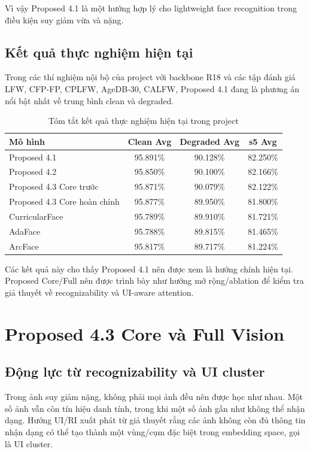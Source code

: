 \documentclass[13pt,a4paper]{extreport}
\begin{document}
Vì vậy Proposed 4.1 là một hướng hợp lý cho lightweight face recognition trong điều kiện suy giảm vừa và nặng.

\section{Kết quả thực nghiệm hiện tại}
Trong các thí nghiệm nội bộ của project với backbone R18 và các tập đánh giá LFW, CFP-FP, CPLFW, AgeDB-30, CALFW, Proposed 4.1 đang là phương án nổi bật nhất về trung bình clean và degraded.

\begin{table}[H]
\centering
\caption{Tóm tắt kết quả thực nghiệm hiện tại trong project}
\begin{tabular}{lccc}
\toprule
\textbf{Mô hình} & \textbf{Clean Avg} & \textbf{Degraded Avg} & \textbf{s5 Avg}\\
\midrule
Proposed 4.1 & 95.891\% & 90.128\% & 82.250\%\\
Proposed 4.2 & 95.850\% & 90.100\% & 82.166\%\\
Proposed 4.3 Core trước & 95.871\% & 90.079\% & 82.122\%\\
Proposed 4.3 Core hoàn chỉnh & 95.877\% & 89.950\% & 81.800\%\\
CurricularFace & 95.789\% & 89.910\% & 81.721\%\\
AdaFace & 95.788\% & 89.815\% & 81.465\%\\
ArcFace & 95.817\% & 89.717\% & 81.224\%\\
\bottomrule
\end{tabular}
\end{table}

Các kết quả này cho thấy Proposed 4.1 nên được xem là hướng chính hiện tại. Proposed Core/Full nên được trình bày như hướng mở rộng/ablation để kiểm tra giả thuyết về recognizability và UI-aware attention.

\chapter{Proposed 4.3 Core và Full Vision}

\section{Động lực từ recognizability và UI cluster}
Trong ảnh suy giảm nặng, không phải mọi ảnh đều nên được học như nhau. Một số ảnh vẫn còn tín hiệu danh tính, trong khi một số ảnh gần như không thể nhận dạng. Hướng UI/RI xuất phát từ giả thuyết rằng các ảnh không còn đủ thông tin nhận dạng có thể tạo thành một vùng/cụm đặc biệt trong embedding space, gọi là UI cluster.
\end{document}
